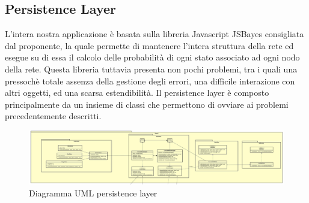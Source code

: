 \subsection{Persistence Layer}
L'intera nostra applicazione è basata sulla libreria Javascript JSBayes consigliata dal proponente, la quale permette di mantenere l'intera struttura della rete ed esegue su di essa il calcolo delle probabilità di ogni stato associato ad ogni nodo della rete.
Questa libreria tuttavia presenta non pochi problemi, tra i quali una pressochè totale assenza della gestione degli errori, una difficile interazione con altri oggetti, ed una scarsa estendibilità.
Il persistence layer è composto principalmente da un insieme di classi che permettono di ovviare ai problemi precedentemente descritti.
\begin{figure} [H]
	\centering
	\includegraphics[scale=0.1]{Img/PersistenceLayer}
	\caption{Diagramma UML persistence layer}\label{}
\end{figure}
